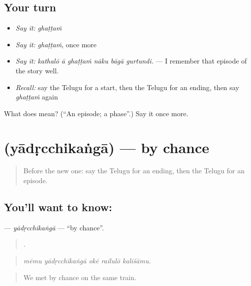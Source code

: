 \subsection*{Your turn}
\begin{itemize}
\raggedright
  \item \emph{Say it:} \emph{ghaṭṭaṁ}
  \item \emph{Say it:} \emph{ghaṭṭaṁ}, once more
  \item \emph{Say it:} \emph{kathalō ā ghaṭṭaṁ nāku bāgā gurtundi.} — I remember that episode of the story well.
  \item \emph{Recall:} say the Telugu for a start, then the Telugu for an ending, then say \emph{ghaṭṭaṁ} again
\end{itemize}

\begin{tcolorbox}[breakable,colback=teal!4,colframe=teal!35!black,title={Before you move on}]
What does  mean? (\textquotedblleft{}An episode; a phase\textquotedblright{}.) Say it once more.
\end{tcolorbox}
\section[\texorpdfstring{\te{యాదృచ్ఛికంగా} (yādṛcchikaṅgā)}{యాదృచ్ఛికంగా (yādṛcchikaṅgā)}]{ (yādṛcchikaṅgā) — by chance}

\label{lesson:TE-C376-yadrcchikanga}



\begin{quote}
Before the new one: say the Telugu for an ending, then the Telugu for an episode.
\end{quote}

\subsection*{You'll want to know: }
\textbf{} — \emph{yādṛcchikaṅgā} — \textquotedblleft{}by chance\textquotedblright{}.

\begin{quote}
    .
\end{quote}

\begin{quote}
\emph{mēmu yādṛcchikaṅgā okē railulō kaliśāmu.}
\end{quote}

\begin{quote}
We met by chance on the same train.
\end{quote}

